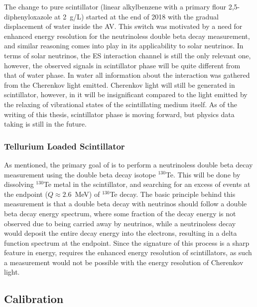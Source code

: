 The change to pure scintillator {\labppo} (linear alkylbenzene with a primary flour 2,5-diphenyloxazole at 2~g/L) started at the end of 2018 with the gradual displacement of water inside the AV.
This switch was motivated by a need for enhanced energy resolution for the neutrinoless double beta decay measurement, and similar reasoning comes into play in its applicability to solar neutrinos.
In terms of solar neutrinos, the ES interaction channel is still the only relevant one, however, the observed signals in scintillator phase will be quite different from that of water phase.
In water all information about the interaction was gathered from the Cherenkov light emitted. 
Cherenkov light will still be generated in scintillator, however, in {\labppo} it will be insignificant compared to the light emitted by the relaxing of vibrational states of the scintillating medium itself.
As of the writing of this thesis, scintillator phase is moving forward, but physics data taking is still in the future.

\subsubsection{Tellurium Loaded Scintillator}
As mentioned, the primary goal of {\snop} is to perform a neutrinoless double beta decay measurement using the double beta decay isotope $^{130}$Te.
This will be done by dissolving $^{130}$Te metal in the {\labppo} scintillator, and searching for an excess of events at the endpoint ($Q \approx 2.6$~MeV) of $^{130}$Te decay.
The basic principle behind this measurement is that a double beta decay with neutrinos should follow a double beta decay energy spectrum, where some fraction of the decay energy is not observed due to being carried away by neutrinos, while a neutrinoless decay would deposit the entire decay energy into the electrons, resulting in a delta function spectrum at the endpoint.
Since the signature of this process is a sharp feature in energy, {\snop} requires the enhanced energy resolution of scintillators, as such a measurement would not be possible with the energy resolution of Cherenkov light.

\subsection{Calibration}

